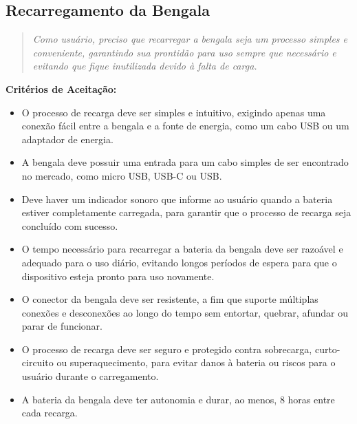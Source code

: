     \subsection{Recarregamento da Bengala}
    \begin{quote}
    \textit{Como usuário, preciso que recarregar a bengala seja um processo simples e conveniente, garantindo sua prontidão para uso sempre que necessário e evitando que fique inutilizada devido à falta de carga.}
    \end{quote}    
    \noindent\textbf{Critérios de Aceitação:}
    \begin{itemize}
        \item O processo de recarga deve ser simples e intuitivo, exigindo apenas uma conexão fácil entre a bengala e a fonte de energia, como um cabo USB ou um adaptador de energia.
        \item A bengala deve possuir uma entrada para um cabo simples de ser encontrado no mercado, como micro USB, USB-C ou USB.
        \item Deve haver um indicador sonoro que informe ao usuário quando a bateria estiver completamente carregada, para garantir que o processo de recarga seja concluído com sucesso.
        \item O tempo necessário para recarregar a bateria da bengala deve ser razoável e adequado para o uso diário, evitando longos períodos de espera para que o dispositivo esteja pronto para uso novamente.
        \item O conector da bengala deve ser resistente, a fim que suporte múltiplas conexões e desconexões ao longo do tempo sem entortar, quebrar, afundar ou parar de funcionar.
        \item O processo de recarga deve ser seguro e protegido contra sobrecarga, curto-circuito ou superaquecimento, para evitar danos à bateria ou riscos para o usuário durante o carregamento.
        \item A bateria da bengala deve ter autonomia e durar, ao menos, 8 horas entre cada recarga.
    \end{itemize}

